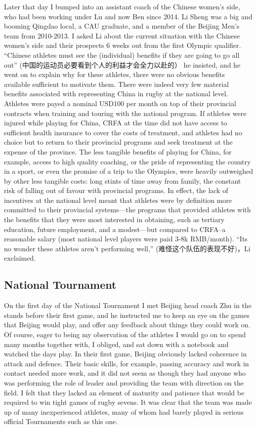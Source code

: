   Later that day I bumped into an assistant coach of the Chinese women's side, who had been working under Lu and now Ben since 2014.  Li Sheng was a big and booming Qingdao local, a CAU graduate, and a member of the Beijing Men's team from 2010-2013.  I asked Li about the current situation with the Chinese women's side and their prospects 6 weeks out from the first Olympic qualifier.  ``Chinese athletes must see the (individual) benefits if they are going to go all out'' (中国的运动员必要看到个人的利益才会全力以赴的） he insisted, and he went on to explain why for these athletes, there were no obvious benefits available sufficient to motivate them.  There were indeed very few material benefits associated with representing China in rugby at the national level.  Athletes were payed a nominal USD100 per month on top of their provincial contracts when training and touring with the national program.  If athletes were injured while playing for China, CRFA at the time did not have access to sufficient health insurance to cover the costs of treatment, and athletes had no choice but to return to their provincial programs and seek treatment at the expense of the province.  The less tangible benefits of playing for China, for example, access to high quality coaching, or the pride of representing the country in a sport, or even the promise of a trip to the Olympics, were heavily outweighed by other less tangible costs: long stints of time away from family, the constant risk of falling out of favour with provincial programs.  In effect, the lack of incentives at the national level meant that athletes were by definition more committed to their provincial systems---the programs that provided athletes with the benefits that they were most interested in obtaining, such as tertiary education, future employment, and a modest---but compared to CRFA--a reasonable salary (most national level players were paid 3-8k RMB/month). ``Its no wonder these athletes aren't performing well,'' (难怪这个队伍的表现不好)，Li exclaimed.

  \subsection{National Tournament}

  On the first day of the National Tournament I met Beijing head coach Zhu in the stands before their first game, and he instructed me to keep an eye on the games that Beijing would play, and offer any feedback about things they could work on.  Of course, eager to being my observation of the athletes I would go on to spend many months together with, I obliged, and sat down with a notebook and watched the days play.  In their first game, Beijing obviously lacked coherence in attack and defence.  Their basic skills, for example, passing accuracy and work in contact needed more work, and it did not seem as though they had anyone who was performing the role of leader and providing the team with direction on the field.  I felt that they lacked an element of maturity and patience that would be required to win tight games of rugby sevens. It was clear that the team was made up of many inexperienced athletes, many of whom had barely played in serious official Tournaments such as this one.

